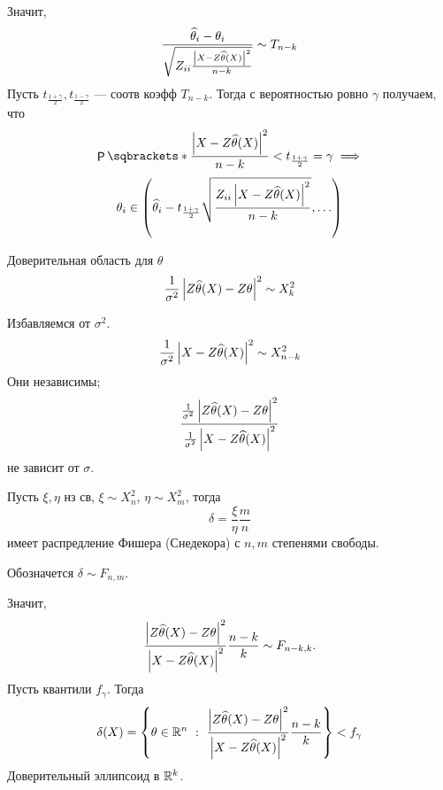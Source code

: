 Значит,
\begin{displaymath}
    \frac{\widehat\theta_i - \theta_i}{\sqrt{ Z_{ii} \frac{\left|X - Z \widehat\theta(X)\right|^2}{n - k}}} \sim T_{n - k}
\end{displaymath}
Пусть \(t_{\frac{1 + \gamma}{2}}, t_{\frac{1 - \gamma}{2}}\) --- соотв коэфф \(T_{n - k}\).
Тогда с вероятностью ровно \(\gamma\) получаем, что
\begin{displaymath}
    \PP{\frac{\abs {X - Z \widehat\theta(X)}^2}{n - k} < t_{\frac{1 + \gamma}{2}}} = \gamma \implies
\end{displaymath}
\begin{displaymath}
    \theta_i \in \left(\widehat\theta_i - t_{\frac{1 + \gamma}{2}} \sqrt{\frac{Z_{ii} \left|X - Z \widehat \theta(X)\right|^2}{n - k}}, \ldots\right)
\end{displaymath}

Доверительная область для \(\theta\)
\begin{displaymath}
    \frac{1}{\sigma^2} \left|Z \widehat\theta(X) - Z \theta\right|^2 \sim X^2_k
\end{displaymath}

Избавляемся от \(\sigma^2\).
\begin{displaymath}
    \frac{1}{\sigma^2} \left|X - Z \widehat\theta(X)\right|^2 \sim X^2_{n - k}
\end{displaymath}
Они независимы;
\begin{displaymath} 
    \frac{\frac{1}{\sigma^2} \left|Z \widehat\theta(X) - Z \theta\right|^2}
    {\frac{1}{\sigma^2} \left|X - Z \widehat\theta(X)\right|^2}
\end{displaymath}
не зависит от \(\sigma\).

\begin{definition}
    Пусть \(\xi, \eta\) нз св, \(\xi \sim X^2_n\), \(\eta \sim X^2_m\), тогда
    \begin{displaymath}
        \delta = \frac{\xi}{\eta} \frac{m}{n}
    \end{displaymath}
    имеет распредление Фишера (Снедекора) с \(n, m\) степенями свободы.

    Обозначется \(\delta \sim F_{n, m}\).
\end{definition}

Значит,
\begin{displaymath} 
    \frac{\left|Z \widehat\theta(X) - Z \theta\right|^2}
    {\left|X - Z \widehat\theta(X)\right|^2} \frac{n - k}{k} \sim F_{n - k, k}.
\end{displaymath}
Пусть квантили \(f_\gamma\). Тогда
\begin{displaymath}
    \delta(X) = \left\{\theta \in \mathbb{R}^n ~:~ \frac{\left|Z \widehat\theta(X) - Z \theta\right|^2}
    {\left|X - Z \widehat\theta(X)\right|^2} \frac{n - k}{k}\right\} < f_\gamma
\end{displaymath}
Доверительный эллипсоид в \(\mathbb{R}^k\).

